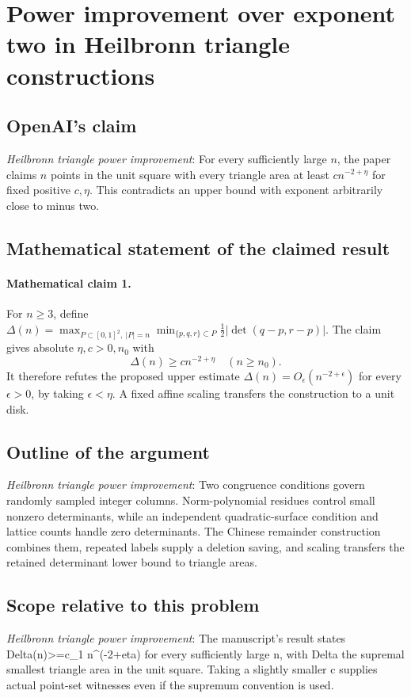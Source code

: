 \documentclass[11pt]{article}
\begin{document}
\section*{Power improvement over exponent two in Heilbronn triangle constructions}

\subsection{OpenAI's claim}
\textit{Heilbronn triangle power improvement}: For every sufficiently large $n$, the paper claims $n$ points in the unit square with every triangle area at least $c n^{-2+\eta}$ for fixed positive $c,\eta$. This contradicts an upper bound with exponent arbitrarily close to minus two.

\subsection{Mathematical statement of the claimed result}
\paragraph{Mathematical claim 1.} For $n\ge3$, define $\Delta(n)=\max_{P\subset[0,1]^2,\ |P|=n}\min_{\{p,q,r\}\subset P}\tfrac12|\det(q-p,r-p)|$. The claim gives absolute $\eta,c>0,n_0$ with \[\Delta(n)\ge cn^{-2+\eta}\quad(n\ge n_0).\] It therefore refutes the proposed upper estimate $\Delta(n)=O_\epsilon(n^{-2+\epsilon})$ for every $\epsilon>0$, by taking $\epsilon<\eta$. A fixed affine scaling transfers the construction to a unit disk.

\subsection{Outline of the argument}
\textit{Heilbronn triangle power improvement}: Two congruence conditions govern randomly sampled integer columns. Norm-polynomial residues control small nonzero determinants, while an independent quadratic-surface condition and lattice counts handle zero determinants. The Chinese remainder construction combines them, repeated labels supply a deletion saving, and scaling transfers the retained determinant lower bound to triangle areas.

\subsection{Scope relative to this problem}
\textit{Heilbronn triangle power improvement}: The manuscript’s result states Delta(n)>=c\_1 n\textasciicircum{}(-2+eta) for every sufficiently large n, with Delta the supremal smallest triangle area in the unit square. Taking a slightly smaller c supplies actual point-set witnesses even if the supremum convention is used.
\end{document}
